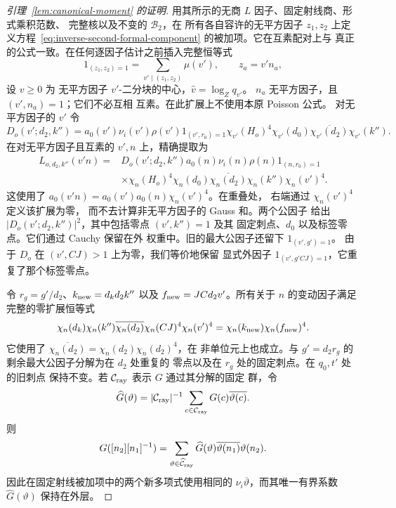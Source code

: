 \documentclass[11pt,a4paper]{article}
\numberwithin{equation}{section}
\numberwithin{figure}{section}
\theoremstyle{definition}
\theoremstyle{remark}
\begin{document}
\begin{proof}[引理~\ref{lem:canonical-moment} 的证明]
用其所示的无商 \(L\) 因子、固定射线商、形式乘积范数、
完整核以及不变的 \(\mathcal B_2\)，在
所有各自容许的无平方因子 \(z_1,z_2\) 上定义方程~\eqref{eq:inverse-second-formal-component}
的被加项。它在互素配对上与
真正的公式一致。在任何逐因子估计之前插入完整恒等式
\[
 1_{(z_1,z_2)=1}=\sum_{v'\mid(z_1,z_2)}\mu(v'),\qquad z_a=v'n_a,
\]
设 \(v\ge0\) 为
无平方因子 \(v'\)-二分块的中心，\(\widehat v=\log_Zq_{v'}\)。
\(n_a\) 无平方因子，且 \((v',n_a)=1\)；它们不必互相
互素。在此扩展上不使用本原 Poisson 公式。
对无平方因子的 \(v'\) 令
\[
 D_o(v';d_2,k'')=a_0(v')\nu_i(v')\rho(v')1_{(v',r_0)=1}
   \chi_{v'}(H_o)^4\chi_{v'}(d_0)\overline{\chi_{v'}(d_2)}\chi_{v'}(k'').
\]
在对无平方因子且互素的 \(v',n\) 上，精确提取为
\begin{equation}\label{eq:inverse-second-extraction}
 \begin{split}
 L_{o,d_2,k''}(v'n)={}&D_o(v';d_2,k'')a_0(n)\nu_i(n)\rho(n)1_{(n,r_0)=1}\\
 &\times\chi_n(H_o)^4\chi_n(d_0)\overline{\chi_n(d_2)}
          \chi_n(k'')\chi_n(v')^4.
 \end{split}
\end{equation}
这使用了 \(a_0(v'n)=a_0(v')a_0(n)\chi_n(v')^4\)。在重叠处，
右端通过 \(\chi_n(v')^4\) 定义该扩展为零，
而不去计算非无平方因子的 Gauss 和。两个公因子
给出 \(|D_o(v';d_2,k'')|^2\)，其中包括零点 \((v',k'')=1\) 及其
固定刺点、\(d_0\) 以及标签零点。它们通过 Cauchy 保留在外
权重中。旧的最大公因子还留下 \(1_{(v',g')=1}\)。
由于 \(D_o\) 在 \((v',CJ)>1\) 上为零，我们等价地保留
显式外因子 \(1_{(v',g'CJ)=1}\)，它重复了那个标签零点。

令 \(r_g=g'/d_2\)、\(k_{\rm new}=d_kd_2k''\) 以及
\(f_{\rm new}=JCd_2v'\)。所有关于 \(n\) 的变动因子满足
完整的零扩展恒等式
\begin{equation}\label{eq:inverse-moving-characters}
 \chi_n(d_k)\chi_n(k'')\overline{\chi_n(d_2)}
       \chi_n(CJ)^4\chi_n(v')^4
 =\chi_n(k_{\rm new})\chi_n(f_{\rm new})^4.
\end{equation}
它使用了 \(\overline{\chi_n(d_2)}=\chi_n(d_2)\chi_n(d_2)^4\)，在
非单位元上也成立。与 \(g'=d_2r_g\) 的剩余最大公因子分解为在 \(d_2\) 处重复的
零点以及在 \(r_g\) 处的固定刺点。在 \(q_0,t'\) 处的旧刺点
保持不变。若 \(\mathcal C_{\rm ray}\) 表示 \(G\) 通过其分解的固定
群，令
\[
 \widehat G(\vartheta)=|\mathcal C_{\rm ray}|^{-1}
       \sum_{c\in\mathcal C_{\rm ray}}G(c)\overline{\vartheta(c)}.
\]
则
\[
 G([n_2][n_1]^{-1})=\sum_{\vartheta\in\widehat{\mathcal C}_{\rm ray}}
   \widehat G(\vartheta)\overline{\vartheta(n_1)}\vartheta(n_2).
\]
因此在固定射线被加项中的两个新多项式使用相同的
\(\nu_i\overline\vartheta\)，而其唯一有界系数
\(\widehat G(\vartheta)\) 保持在外层。


\end{proof}
\end{document}
